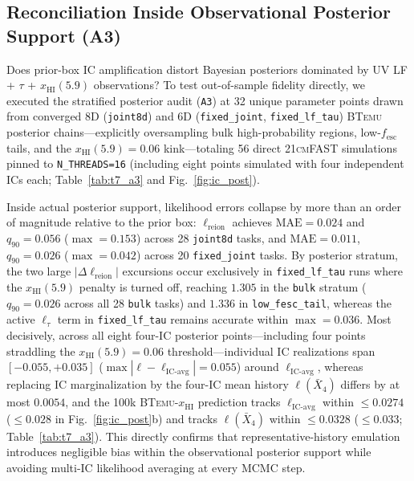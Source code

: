 \documentclass[aps,prd,reprint,superscriptaddress,nofootinbib,amsmath,amssymb,floatfix,longbibliography]{revtex4-2}
\begin{document}
\subsection{Reconciliation Inside Observational Posterior Support (A3)}\label{sec:a3}

Does prior-box IC amplification distort Bayesian posteriors dominated by UV LF + $\tau$ + $x_{\mathrm{HI}}(5.9)$ observations? To test out-of-sample fidelity directly, we executed the stratified posterior audit (\texttt{A3}) at 32 unique parameter points drawn from converged 8D (\texttt{joint8d}) and 6D (\texttt{fixed\_joint}, \texttt{fixed\_lf\_tau}) \textsc{BTemu} posterior chains---explicitly oversampling bulk high-probability regions, low-$f_{\mathrm{esc}}$ tails, and the $x_{\mathrm{HI}}(5.9)=0.06$ kink---totaling 56 direct \textsc{21cmFAST} simulations pinned to \texttt{N\_THREADS=16} (including eight points simulated with four independent ICs each; Table~\ref{tab:t7_a3} and Fig.~\ref{fig:ic_post}).

Inside actual posterior support, likelihood errors collapse by more than an order of magnitude relative to the prior box: $\ell_{\mathrm{reion}}$ achieves $\mathrm{MAE}=0.024$ and $q_{90}=0.056$ ($\max = 0.153$) across 28 \texttt{joint8d} tasks, and $\mathrm{MAE}=0.011$, $q_{90}=0.026$ ($\max = 0.042$) across 20 \texttt{fixed\_joint} tasks. By posterior stratum, the two large $|\Delta\ell_{\mathrm{reion}}|$ excursions occur exclusively in \texttt{fixed\_lf\_tau} runs where the $x_{\mathrm{HI}}(5.9)$ penalty is turned off, reaching $1.305$ in the \texttt{bulk} stratum ($q_{90}=0.026$ across all 28 \texttt{bulk} tasks) and $1.336$ in \texttt{low\_fesc\_tail}, whereas the active $\ell_{\tau}$ term in \texttt{fixed\_lf\_tau} remains accurate within $\max = 0.036$. Most decisively, across all eight four-IC posterior points---including four points straddling the $x_{\mathrm{HI}}(5.9)=0.06$ threshold---individual IC realizations span $[-0.055, +0.035]$ ($\max |\ell - \ell_{\mathrm{IC\text{-}avg}}| = 0.055$) around $\ell_{\mathrm{IC\text{-}avg}}$, whereas replacing IC marginalization by the four-IC mean history $\ell(\bar{X}_4)$ differs by at most $0.0054$, and the 100k \textsc{BTemu}-$x_{\mathrm{HI}}$ prediction tracks $\ell_{\mathrm{IC\text{-}avg}}$ within $\le 0.0274$ ($\le 0.028$ in Fig.~\ref{fig:ic_post}b) and tracks $\ell(\bar{X}_4)$ within $\le 0.0328$ ($\le 0.033$; Table~\ref{tab:t7_a3}). This directly confirms that representative-history emulation introduces negligible bias within the observational posterior support while avoiding multi-IC likelihood averaging at every MCMC step.
\end{document}
